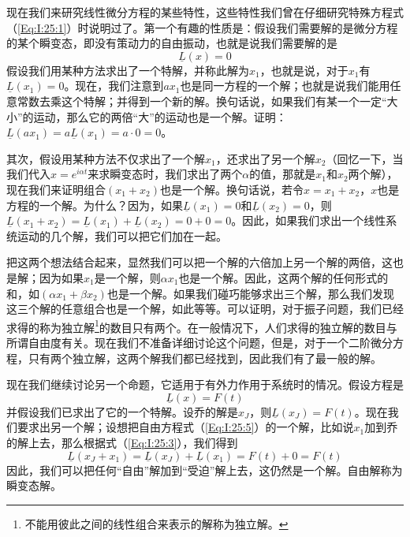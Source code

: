 现在我们来研究线性微分方程的某些特性，这些特性我们曾在仔细研究特殊方程式（\ref{Eq:I:25:1}）时说明过了。第一个有趣的性质是：假设我们需要解的是微分方程的某个瞬变态，即没有策动力的自由振动，也就是说我们需要解的是
\begin{equation}
    \label{Eq:I:25:5}
    \underline{L}(x)=0
\end{equation}
假设我们用某种方法求出了一个特解，并称此解为$x_1$，也就是说，对于$x_1$有$\underline{L}(x_1)=0$。现在，我们注意到$ax_1$也是同一方程的一个解；也就是说我们能用任意常数去乘这个特解；并得到一个新的解。换句话说，如果我们有某一个一定“大小”的运动，那么它的两倍“大”的运动也是一个解。证明：$\underline{L}(ax_1)=a\underline{L}(x_1)=a\cdot 0=0$。

其次，假设用某种方法不仅求出了一个解$x_1$，还求出了另一个解$x_2$（回忆一下，当我们代入$x=e^{i\alpha t}$来求瞬变态时，我们求出了两个$\alpha$的值，那就是$x_1$和$x_2$两个解），现在我们来证明组合$(x_1+x_2)$也是一个解。换句话说，若令$x=x_1+x_2$，$x$也是方程的一个解。为什么？因为，如果$\underline{L}(x_1)=0$和$\underline{L}(x_2)=0$，则$\underline{L}(x_1+x_2)=\underline{L}(x_1)+\underline{L}(x_2)=0+0=0$。因此，如果我们求出一个线性系统运动的几个解，我们可以把它们加在一起。

把这两个想法结合起来，显然我们可以把一个解的六倍加上另一个解的两倍，这也是解；因为如果$x_1$是一个解，则$\alpha x_1$也是一个解。因此，这两个解的任何形式的和，如$(\alpha x_1+\beta x_2)$也是一个解。如果我们碰巧能够求出三个解，那么我们发现这三个解的任意组合也是一个解，如此等等。可以证明，对于振子问题，我们已经求得的称为独立解\footnote{不能用彼此之间的线性组合来表示的解称为独立解。}的数目只有两个。在一般情况下，人们求得的独立解的数目与所谓自由度有关。现在我们不准备详细讨论这个问题，但是，对于一个二阶微分方程，只有两个独立解，这两个解我们都已经找到，因此我们有了最一般的解。

现在我们继续讨论另一个命题，它适用于有外力作用于系统时的情况。假设方程是
\begin{equation}
    \label{Eq:I:25:6}
    \underline{L}(x) = F(t)
\end{equation}
并假设我们已求出了它的一个特解。设乔的解是$x_J$，则$\underline{L}(x_J)=F(t)$。现在我们要求出另一个解；设想把自由方程式（\ref{Eq:I:25:5}）的一个解，比如说$x_1$加到乔的解上去，那么根据式（\ref{Eq:I:25:3}），我们得到
\begin{equation}
    \label{Eq:I:25:7}
    \underline{L}(x_J+x_1)=\underline{L}(x_J)+\underline{L}(x_1)=F(t)+0=F(t)
\end{equation}
因此，我们可以把任何“自由”解加到“受迫”解上去，这仍然是一个解。自由解称为瞬变态解。


